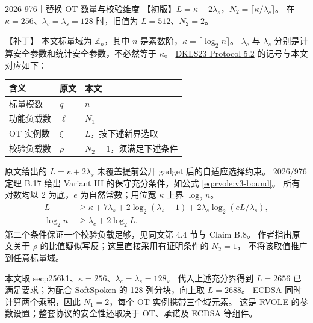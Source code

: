 \begin{patchnote}{2026-976｜替换 OT 数量与校验维度}
  【初版】$L=\kappa+2\lambda_s$，$N_2=\lceil\kappa/\lambda_c\rceil$。
  在 $\kappa=256$、$\lambda_c=\lambda_s=128$ 时，旧值为 $L=512$、$N_2=2$。

  【补丁】
  本文标量域为 $\mathbb Z_n$，其中 $n$ 是素数阶，$\kappa=\lceil\log_2 n\rceil$。
  $\lambda_c$ 与 $\lambda_s$ 分别是计算安全参数和统计安全参数，不必然等于 $\kappa$。
  \href{https://eprint.iacr.org/2023/765.pdf}{DKLS23 Protocol 5.2} 的记号与本文对应如下：
  \begin{center}
    \begin{tabular}{lll}
      \toprule
      含义     & 原文     & 本文              \\
      \midrule
      标量模数   & $q$    & $n$             \\
      功能负载数  & $\ell$ & $N_1$           \\
      OT 实例数 & $\xi$  & $L$，按下述新界选取     \\
      校验负载数  & $\rho$ & $N_2=1$，须满足下述条件 \\
      \bottomrule
    \end{tabular}
  \end{center}
  原文给出的 $L=\kappa+2\lambda_s$ 未覆盖提前公开 gadget 后的自适应选择约束。
  2026/976 定理 B.17 给出 Variant III 的保守充分条件，如公式 \eqref{eq:rvole:v3-bound}。
  所有对数均以 2 为底，$e$ 为自然常数；用位宽 $\kappa$ 上界 $\log_2 n$。
  \begin{equation}
    \label{eq:rvole:v3-bound}\tag{v3-bound}
    \begin{aligned}
      L\;        & \ge\kappa+7\lambda_s+2\log_2(\lambda_s+1)
      +2\lambda_s\log_2(eL/\lambda_s),                       \\
      \log_2 n\; & \ge\lambda_c+2\log_2 L.
    \end{aligned}
  \end{equation}
  第二个条件保证一个校验负载足够，见同文第 4.4 节与 Claim B.8。
  作者指出原文关于 $\rho$ 的比值疑似写反；这里直接采用有证明条件的 $N_2=1$，
  不将该取值推广到任意标量域。

  本文取 secp256k1、$\kappa=256$、$\lambda_c=\lambda_s=128$。
  代入上述充分界得到 $L=2656$ 已满足要求；为配合 SoftSpoken 的 128 列分块，向上取 $L=2688$。
  ECDSA 同时计算两个乘积，因此 $N_1=2$，每个 OT 实例携带三个域元素。
  这是 RVOLE 的参数设置；整套协议的安全性还取决于 OT、承诺及 ECDSA 等组件。
\end{patchnote}

